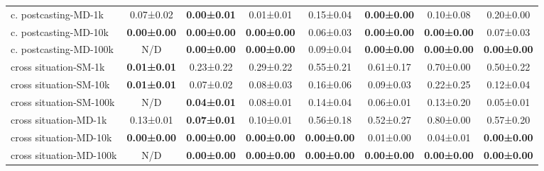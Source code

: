 \documentclass{article}
\begin{document}
\begin{table}[H]
{\begin{tabular}{lccccccc}
    c. postcasting-MD-1k           & 0.07±0.02      & \textbf{0.00±0.01}  & 0.01±0.01      & 0.15±0.04      & \textbf{0.00±0.00}        & 0.10±0.08           & 0.20±0.00      \\
    c. postcasting-MD-10k          & \textbf{0.00±0.00}  & \textbf{0.00±0.00}  & \textbf{0.00±0.00}  & 0.06±0.03      & \textbf{0.00±0.00}        & \textbf{0.00±0.00}       & 0.07±0.03      \\
    c. postcasting-MD-100k         & N/D              & \textbf{0.00±0.00}  & \textbf{0.00±0.00}  & 0.09±0.04      & \textbf{0.00±0.00}        & \textbf{0.00±0.00}       & \textbf{0.00±0.00}  \\
    cross situation-SM-1k                  & \textbf{0.01±0.01}  & 0.23±0.22      & 0.29±0.22      & 0.55±0.21      & 0.61±0.17            & 0.70±0.00           & 0.50±0.22      \\
    cross situation-SM-10k                 & \textbf{0.01±0.01}  & 0.07±0.02      & 0.08±0.03      & 0.16±0.06      & 0.09±0.03            & 0.22±0.25           & 0.12±0.04      \\
    cross situation-SM-100k                & N/D              & \textbf{0.04±0.01}  & 0.08±0.01      & 0.14±0.04      & 0.06±0.01            & 0.13±0.20           & 0.05±0.01      \\
    cross situation-MD-1k                  & 0.13±0.01      & \textbf{0.07±0.01}  & 0.10±0.01      & 0.56±0.18      & 0.52±0.27            & 0.80±0.00           & 0.57±0.20      \\
    cross situation-MD-10k                 & \textbf{0.00±0.00}  & \textbf{0.00±0.00}  & \textbf{0.00±0.00}  & \textbf{0.00±0.00}  & 0.01±0.00            & 0.04±0.01           & \textbf{0.00±0.00}  \\
    cross situation-MD-100k                & N/D              & \textbf{0.00±0.00}  & \textbf{0.00±0.00}  & \textbf{0.00±0.00}  & \textbf{0.00±0.00}        & \textbf{0.00±0.00}       & \textbf{0.00±0.00}  \\
    \bottomrule
    \end{tabular}
}
\end{table}
\end{document}
